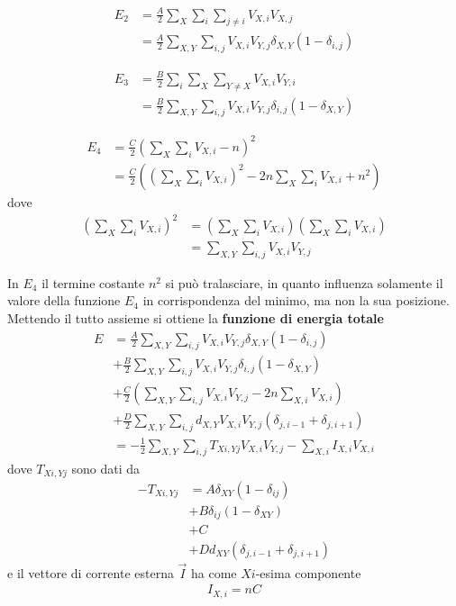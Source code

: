 \begin{align*}
	E_2 &= \frac{A}{2} \sum_X \sum_i \sum_{j \neq i} V_{X,i} V_{X,j} \\
	&= \frac{A}{2} \sum_{X,Y} \sum_{i,j} V_{X,i} V_{Y,j} \delta_{X,Y} (1 - \delta_{i,j})
\end{align*}

\begin{align*}
	E_3 &= \frac{B}{2} \sum_i \sum_X \sum_{Y \neq X} V_{X,i} V_{Y,i} \\
	&= \frac{B}{2} \sum_{X,Y} \sum_{i,j} V_{X,i} V_{Y,j} \delta_{i,j} (1 - \delta_{X,Y})
\end{align*}

\begin{align*}
	E_4 &= \frac{C}{2}\left(\sum_X \sum_i V_{X,i} - n \right)^2 \\
	&= \frac{C}{2} \left(\left(\sum_X \sum_i V_{X,i}\right)^2 - 2n \sum_X \sum_i V_{X,i} + n^2 \right)
\end{align*}
dove
\begin{align*}
	\left(\sum_X \sum_i V_{X,i}\right)^2 &= \left(\sum_X \sum_i V_{X,i}\right) \left(\sum_X \sum_i V_{X,i} \right) \\
	&= \sum_{X,Y} \sum_{i,j} V_{X,i} V_{Y,j}
\end{align*}

\newpage

\noindent In $E_4$ il termine costante $n^2$ si può tralasciare, in quanto influenza solamente il valore della funzione $E_4$ in corrispondenza del minimo, ma non la sua posizione. Mettendo il tutto assieme si ottiene la \textbf{funzione di energia totale}
\begin{align*}
	E &= \frac{A}{2} \sum_{X,Y} \sum_{i,j} V_{X,i} V_{Y,j} \delta_{X,Y} (1 - \delta_{i,j}) \\
	&+ \frac{B}{2} \sum_{X,Y} \sum_{i,j} V_{X,i} V_{Y,j} \delta_{i,j} (1 - \delta_{X,Y}) \\
	&+ \frac{C}{2} \left(\sum_{X,Y} \sum_{i,j} V_{X,i} V_{Y,j} - 2n \sum_{X,i} V_{X,i} \right) \\
	&+ \frac{D}{2} \sum_{X,Y} \sum_{i,j} d_{X,Y} V_{X,i} V_{Y,j} (\delta_{j, i-1} + \delta_{j, i+1}) \\
	&= - \frac{1}{2} \sum_{X, Y} \sum_{i, j} T_{Xi, Yj} V_{X, i} V_{Y, j} - \sum_{X, i} I_{X, i} V_{X, i}
\end{align*}
dove $T_{Xi, Yj}$ sono dati da
\begin{align*}
	-T_{Xi, Yj} &= A \delta_{XY} (1 - \delta_{ij}) \tag{Peso inibitorio in ogni riga}\\
	& +B \delta_{ij} (1 - \delta_{XY}) \tag{Peso inibitorio in ogni colonna} \\
	& +C  \qquad \tag{Inibizione globale}\\
	& +D d_{XY} (\delta_{j,i-1} + \delta_{j, i+1}) \tag{Costo del cammino minimo}
\end{align*}
e il vettore di corrente esterna $\vec{I}$ ha come $Xi$-esima componente
\begin{align*}
	I_{X, i} = nC\tag{Corrente esterna eccitatoria}
\end{align*}

